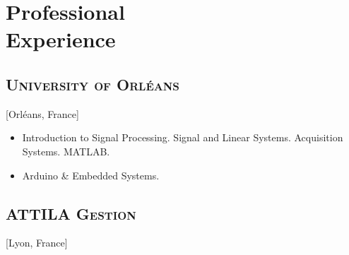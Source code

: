 \documentclass{mycv}
\begin{document}
\vspace{-1em}

\section{Professional \\ Experience}

\subsection{\large \scshape University of Orl\'eans}[Orl\'eans, France]

\begin{positions}
\end{positions}

\begin{itemize}
  \itemsep 0em
  \item Introduction to Signal Processing. Signal and Linear Systems. Acquisition Systems. MATLAB.
  \item Arduino \& Embedded Systems.
\end{itemize}

\vspace{-\parskip}

\subsection{\large \scshape ATTILA Gestion}[Lyon, France]

\begin{positions}
\end{positions}
\end{document}

